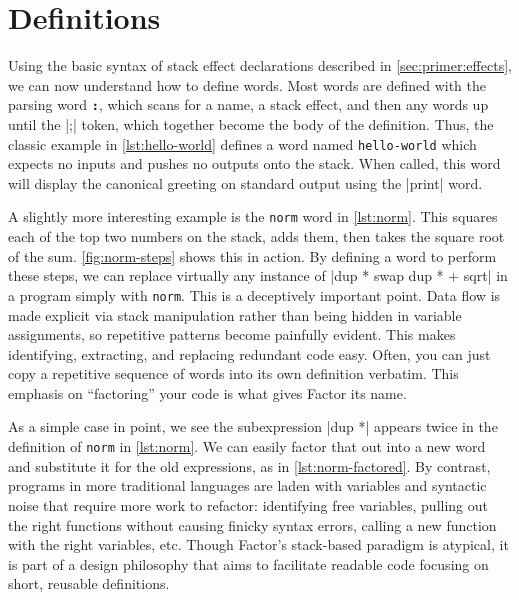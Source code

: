 \section{Definitions}\label{sec:primer:colon-defs}


Using the basic syntax of stack effect declarations described in
\cref{sec:primer:effects}, we can now understand how to define words.  Most
words are defined with the parsing word \texttt{\textbf{:}}, which scans for a
name, a stack effect, and then any words up until the \factor|;| token, which
together become the body of the definition.  Thus, the classic example in
\vref{lst:hello-world} defines a word named \Verb|hello-world| which expects no
inputs and pushes no outputs onto the stack.  When called, this word will
display the canonical greeting on standard output using the \factor|print|
word.



A slightly more interesting example is the \Verb|norm| word in
\vref{lst:norm}.  This squares each of the top two numbers on the stack, adds
them, then takes the square root of the sum.  \vref{fig:norm-steps} shows this
in action.  By defining a word to perform these steps, we can replace virtually
any instance of
%
\factor|dup * swap dup * + sqrt|
%
in a program simply with \Verb|norm|.  This is a deceptively important point.
Data flow is made explicit via stack manipulation rather than being hidden in
variable assignments, so repetitive patterns become painfully evident.  This
makes identifying, extracting, and replacing redundant code easy.  Often, you
can just copy a repetitive sequence of words into its own definition verbatim.
This emphasis on ``factoring'' your code is what gives Factor its name.

As a simple case in point, we see the subexpression \factor|dup *| appears
twice in the definition of \Verb|norm| in \vref{lst:norm}.  We can easily
factor that out into a new word and substitute it for the old expressions, as
in \vref{lst:norm-factored}.  By contrast, programs in more traditional
languages are laden with variables and syntactic noise that require more work
to refactor: identifying free variables, pulling out the right functions
without causing finicky syntax errors, calling a new function with the right
variables, etc.  Though Factor's stack-based paradigm is atypical, it is part
of a design philosophy that aims to facilitate readable code focusing on short,
reusable definitions.

